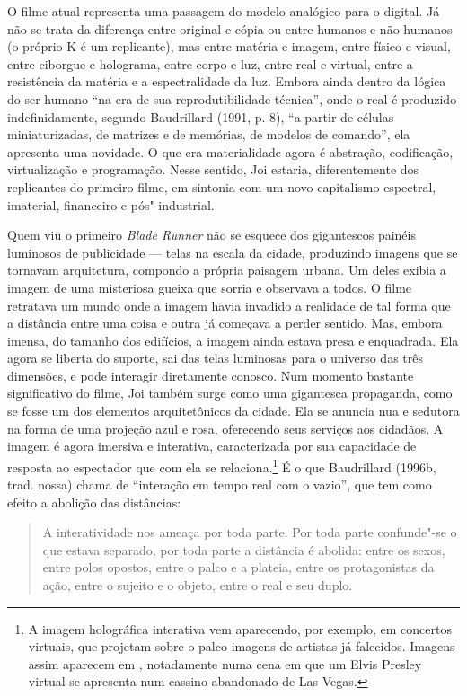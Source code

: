 O filme atual representa uma passagem do modelo analógico para o
digital. Já não se trata da diferença entre original e cópia ou entre
humanos e não humanos (o próprio K é um replicante), mas entre matéria e
imagem, entre físico e visual, entre ciborgue e holograma, entre corpo e
luz, entre real e virtual, entre a resistência da matéria e a
espectralidade da luz. Embora ainda dentro da lógica do ser humano ``na
era de sua reprodutibilidade técnica'', onde o real é produzido
indefinidamente, segundo Baudrillard (1991, p. 8), ``a partir de células
miniaturizadas, de matrizes e de memórias, de modelos de comando'', ela
apresenta uma novidade. O que era materialidade agora é abstração,
codificação, virtualização e programação. Nesse sentido, Joi estaria,
diferentemente dos replicantes do primeiro filme, em sintonia com um
novo capitalismo espectral, imaterial, financeiro e pós"-industrial.

Quem viu o primeiro \emph{Blade Runner} não se esquece dos gigantescos
painéis luminosos de publicidade --- telas na escala da cidade,
produzindo imagens que se tornavam arquitetura, compondo a própria
paisagem urbana. Um deles exibia a imagem de uma misteriosa gueixa que
sorria e observava a todos. O filme retratava um mundo onde a imagem
havia invadido a realidade de tal forma que a distância entre uma coisa
e outra já começava a perder sentido. Mas, embora imensa, do tamanho dos
edifícios, a imagem ainda estava presa e enquadrada. Ela agora se
liberta do suporte, sai das telas luminosas para o universo das três
dimensões, e pode interagir diretamente conosco. Num momento bastante
significativo do filme, Joi também surge como uma gigantesca propaganda,
como se fosse um dos elementos arquitetônicos da cidade. Ela se anuncia
nua e sedutora na forma de uma projeção azul e rosa, oferecendo seus
serviços aos cidadãos. A imagem é agora imersiva e interativa,
caracterizada por sua capacidade de resposta ao espectador que com ela
se relaciona.\footnote{A imagem holográfica interativa vem aparecendo,
  por exemplo, em concertos virtuais, que projetam sobre o palco imagens
  de artistas já falecidos. Imagens assim aparecem em {}, notadamente numa cena em que um Elvis Presley virtual se
  apresenta num cassino abandonado de Las Vegas.} É o que Baudrillard
(1996b, trad. nossa) chama de ``interação em tempo real com o vazio'', que
tem como efeito a abolição das distâncias:

\begin{quote}
A interatividade nos ameaça por toda parte. Por toda parte confunde"-se o
que estava separado, por toda parte a distância é abolida: entre os
sexos, entre polos opostos, entre o palco e a plateia, entre os
protagonistas da ação, entre o sujeito e o objeto, entre o real e seu
duplo.
\end{quote}

